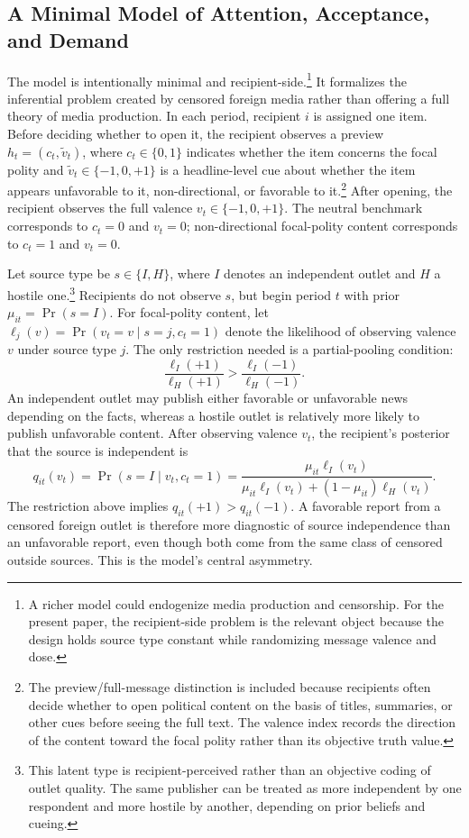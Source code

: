 \documentclass[12pt,american]{article}
\begin{document}
	\subsection*{A Minimal Model of Attention, Acceptance, and Demand}
	
The model is intentionally minimal and recipient-side.\footnote{A richer model could endogenize media production and censorship. For the present paper, the recipient-side problem is the relevant object because the design holds source type constant while randomizing message valence and dose.} It formalizes the inferential problem created by censored foreign media rather than offering a full theory of media production. In each period, recipient \(i\) is assigned one item. Before deciding whether to open it, the recipient observes a preview \(h_t=(c_t,\tilde v_t)\), where \(c_t\in\{0,1\}\) indicates whether the item concerns the focal polity and \(\tilde v_t\in\{-1,0,+1\}\) is a headline-level cue about whether the item appears unfavorable to it, non-directional, or favorable to it.\footnote{The preview/full-message distinction is included because recipients often decide whether to open political content on the basis of titles, summaries, or other cues before seeing the full text. The valence index records the direction of the content toward the focal polity rather than its objective truth value.} After opening, the recipient observes the full valence \(v_t\in\{-1,0,+1\}\). The neutral benchmark corresponds to \(c_t=0\) and \(v_t=0\); non-directional focal-polity content corresponds to \(c_t=1\) and \(v_t=0\).
	
		Let source type be \(s\in\{I,H\}\), where \(I\) denotes an independent outlet and \(H\) a hostile one.\footnote{This latent type is recipient-perceived rather than an objective coding of outlet quality. The same publisher can be treated as more independent by one respondent and more hostile by another, depending on prior beliefs and cueing.} Recipients do not observe \(s\), but begin period \(t\) with prior \(\mu_{it}=\Pr(s=I)\). For focal-polity content, let \(\ell_j(v)=\Pr(v_t=v\mid s=j,c_t=1)\) denote the likelihood of observing valence \(v\) under source type \(j\). The only restriction needed is a partial-pooling condition:
	\[
	\frac{\ell_I(+1)}{\ell_H(+1)}>\frac{\ell_I(-1)}{\ell_H(-1)}.
	\]
		An independent outlet may publish either favorable or unfavorable news depending on the facts, whereas a hostile outlet is relatively more likely to publish unfavorable content. After observing valence \(v_t\), the recipient's posterior that the source is independent is
	\[
	q_{it}(v_t)=\Pr(s=I\mid v_t,c_t=1)=\frac{\mu_{it}\ell_I(v_t)}{\mu_{it}\ell_I(v_t)+(1-\mu_{it})\ell_H(v_t)}.
	\]
		The restriction above implies \(q_{it}(+1)>q_{it}(-1)\). A favorable report from a censored foreign outlet is therefore more diagnostic of source independence than an unfavorable report, even though both come from the same class of censored outside sources. This is the model's central asymmetry.
	
\end{document}

